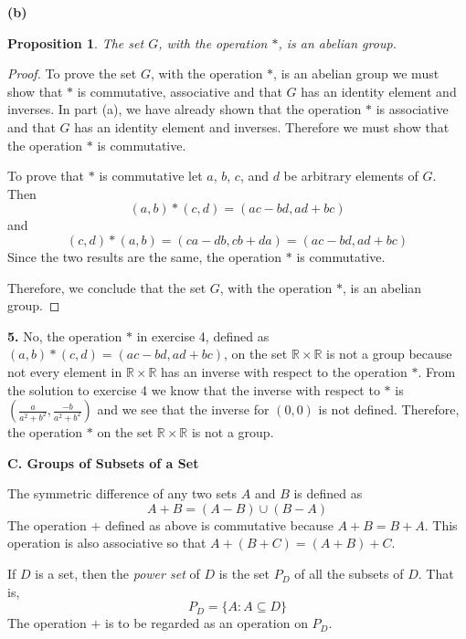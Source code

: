 \documentclass[12pt]{article}   %
\newtheorem*{proposition}{Proposition}  %
\begin{document}
\bigskip
\noindent\textbf{(b)}
\begin{proposition}
The set $G$, with the operation $\ast$, is an abelian group.
\end{proposition}
\begin{proof}
To prove the set $G$, with the operation $\ast$, is an abelian group we must show that $\ast$ is commutative, associative and that $G$ has an identity element and inverses. In part (a), we have already shown that the operation $*$ is associative and that $G$ has an identity element and inverses. Therefore we must show that the operation $*$ is commutative.

To prove that $*$ is commutative let $a$, $b$, $c$, and $d$ be arbitrary elements of $G$. Then
\begin{equation*}
(a,b)*(c,d) = (ac - bd, ad + bc)
\end{equation*}
and
\begin{equation*}
(c,d)*(a,b) = (ca - db, cb + da) = (ac - bd, ad + bc)
\end{equation*}
Since the two results are the same, the operation $\ast$ is commutative.

Therefore, we conclude that the set $G$, with the operation $\ast$, is an abelian group.
\end{proof}

\noindent\textbf{5.} \quad No, the operation $*$ in exercise 4, defined as $(a,b)*(c,d) = (ac - bd, ad + bc)$, on the set $\mathbb{R} \times \mathbb{R}$ is not a group because not every element in $\mathbb{R} \times \mathbb{R}$ has an inverse with respect to the operation $*$. From the solution to exercise 4 we know that the inverse with respect to $*$ is $(\tfrac{a}{a^2 + b^2}, \tfrac{-b}{a^2 + b^2})$ and we see that the inverse for $(0,0)$ is not defined. Therefore, the operation $*$ on the set $\mathbb{R} \times \mathbb{R}$ is not a group.

\bigskip

\noindent\textbf{C. Groups of Subsets of a Set} \smallskip

The symmetric difference of any two sets $A$ and $B$ is defined as
\begin{equation*}
A + B = (A - B) \cup (B - A)
\end{equation*}
The operation $+$ defined as above is commutative because $A + B = B + A$. This operation is also associative so that $A + (B + C) = (A + B) + C$.

If $D$ is a set, then the \textit{power set} of $D$ is the set $P_D$ of all the subsets of $D$. That is,
\begin{equation*}
P_D = \{A: A \subseteq D\}
\end{equation*}
The operation $+$ is to be regarded as an operation on $P_D$.
\end{document}
